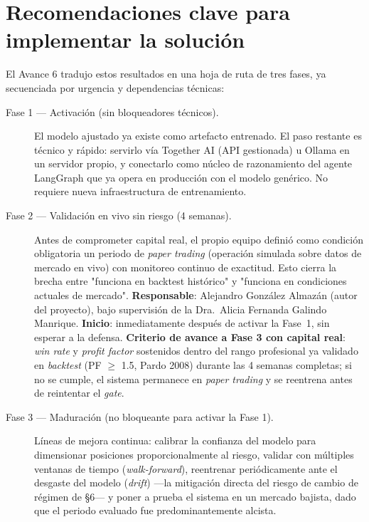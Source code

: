 \documentclass[11pt]{article}
\begin{document}
\section{Recomendaciones clave para implementar la soluci\'on}

El Avance 6 tradujo estos resultados en una hoja de ruta de tres fases, ya secuenciada por urgencia y dependencias t\'ecnicas:

\begin{description}
\item[Fase 1 --- Activaci\'on (sin bloqueadores t\'ecnicos).] El modelo ajustado ya existe como artefacto entrenado. El paso restante es t\'ecnico y r\'apido: servirlo v\'ia Together AI (API gestionada) u Ollama en un servidor propio, y conectarlo como n\'ucleo de razonamiento del agente LangGraph que ya opera en producci\'on con el modelo gen\'erico. No requiere nueva infraestructura de entrenamiento.
\item[Fase 2 --- Validaci\'on en vivo sin riesgo (4 semanas).] Antes de comprometer capital real, el propio equipo defini\'o como condici\'on obligatoria un periodo de \textit{paper trading} (operaci\'on simulada sobre datos de mercado en vivo) con monitoreo continuo de exactitud. Esto cierra la brecha entre "funciona en backtest hist\'orico" y "funciona en condiciones actuales de mercado". \textbf{Responsable}: Alejandro Gonz\'alez Almaz\'an (autor del proyecto), bajo supervisi\'on de la Dra.\ Alicia Fernanda Galindo Manrique. \textbf{Inicio}: inmediatamente despu\'es de activar la Fase~1, sin esperar a la defensa. \textbf{Criterio de avance a Fase 3 con capital real}: \textit{win rate} y \textit{profit factor} sostenidos dentro del rango profesional ya validado en \textit{backtest} (PF $\geq$ 1.5, Pardo 2008) durante las 4 semanas completas; si no se cumple, el sistema permanece en \textit{paper trading} y se reentrena antes de reintentar el \textit{gate}.
\item[Fase 3 --- Maduraci\'on (no bloqueante para activar la Fase 1).] L\'ineas de mejora continua: calibrar la confianza del modelo para dimensionar posiciones proporcionalmente al riesgo, validar con m\'ultiples ventanas de tiempo (\textit{walk-forward}), reentrenar peri\'odicamente ante el desgaste del modelo (\textit{drift}) ---la mitigaci\'on directa del riesgo de cambio de r\'egimen de \S6--- y poner a prueba el sistema en un mercado bajista, dado que el periodo evaluado fue predominantemente alcista.
\end{description}
\end{document}
